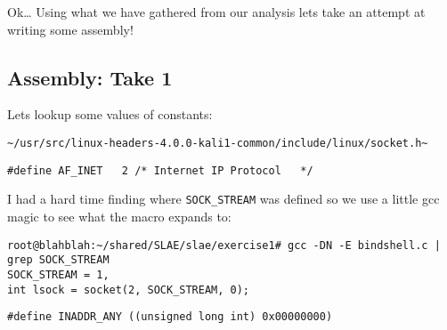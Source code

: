 \documentclass[11pt]{article}
\begin{document}
Ok\ldots{} Using what we have gathered from our analysis lets take an attempt at
writing some assembly!

\subsection{Assembly: Take 1}
\label{sec-1-5}

Lets lookup some values of constants:

\begin{verbatim}
~/usr/src/linux-headers-4.0.0-kali1-common/include/linux/socket.h~
\end{verbatim}

\begin{verbatim}
#define AF_INET   2 /* Internet IP Protocol   */
\end{verbatim}

I had a hard time finding where \verb~SOCK_STREAM~ was defined so we use
a little gcc magic to see what the macro expands to:

\begin{verbatim}
root@blahblah:~/shared/SLAE/slae/exercise1# gcc -DN -E bindshell.c | grep SOCK_STREAM
SOCK_STREAM = 1,
int lsock = socket(2, SOCK_STREAM, 0);
\end{verbatim}

\begin{verbatim}
#define INADDR_ANY ((unsigned long int) 0x00000000)
\end{verbatim}
\end{document}
